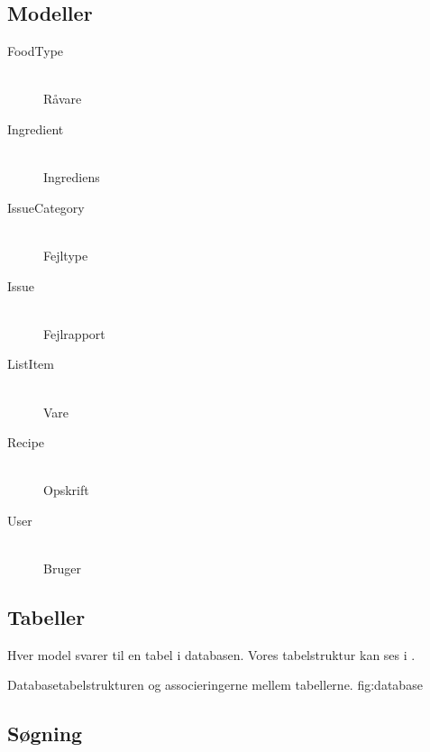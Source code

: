\subsection{Modeller}

\begin{description}

  \item[FoodType] \hfill \\
  Råvare

  \item[Ingredient] \hfill \\
  Ingrediens

  \item[IssueCategory] \hfill \\
  Fejltype

  \item[Issue] \hfill \\
  Fejlrapport

  \item[ListItem] \hfill \\
  Vare

  \item[Recipe] \hfill \\
  Opskrift

  \item[User] \hfill \\
  Bruger

\end{description}

\subsection{Tabeller}
\label{sec:tabeller}

Hver model svarer til en tabel i databasen. Vores tabelstruktur kan ses i .

  {Databasetabelstrukturen og associeringerne mellem tabellerne.}
  {fig:database}

\subsection{Søgning}
\label{sec:soegning}



